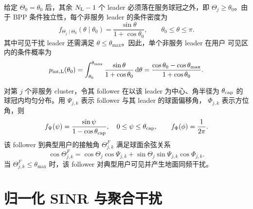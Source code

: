 \documentclass[UTF8,a4paper,11pt]{ctexart}
\newcommand{\thetac}{\theta_{\rm cap}}
\newcommand{\thetam}{\theta_{\max}}
\newcommand{\NL}{N_{\rm L}}
\newcommand{\dd}{\,{\rm d}}
\begin{document}
给定 $\Theta_0=\theta_0$ 后，其余 $\NL-1$ 个 leader 必须落在服务球冠之外，即
$\Theta_j\geq \theta_0$。由于 BPP 条件独立性，每个非服务 leader 的条件密度为
\begin{equation}
    f_{\Theta_j\mid\Theta_0}(\theta\mid\theta_0)
    =
    \frac{\sin\theta}{1+\cos\theta_0},
    \qquad
    \theta_0\leq\theta\leq\pi .
    \label{eq:conditional-leader}
\end{equation}
其中可见干扰 leader 还需满足 $\theta\leq\thetam$。因此，单个非服务 leader 在用户
可见区内的条件概率为
\begin{equation}
    p_{\rm int,L}(\theta_0)
    =
    \int_{\theta_0}^{\thetam}
    \frac{\sin\theta}{1+\cos\theta_0}\dd\theta
    =
    \frac{\cos\theta_0-\cos\thetam}{1+\cos\theta_0}.
    \label{eq:visible-interferer-prob}
\end{equation}

对第 $j$ 个非服务 cluster，令其 follower 在以该 leader 为中心、角半径为
$\thetac$ 的球冠内均匀分布。用 $\Psi_{j,k}$ 表示 follower 与其 leader 的球面偏移角，
$\Phi_{j,k}$ 表示方位角，则
\begin{equation}
    f_{\Psi}(\psi)=
    \frac{\sin\psi}{1-\cos\thetac},
    \quad 0\leq\psi\leq\thetac,
    \qquad
    f_{\Phi}(\phi)=\frac{1}{2\pi}.
\end{equation}
该 follower 到典型用户的接触角 $\Theta^F_{j,k}$ 满足球面余弦关系
\begin{equation}
    \cos\Theta^F_{j,k}
    =
    \cos\Theta_j\cos\Psi_{j,k}
    +\sin\Theta_j\sin\Psi_{j,k}\cos\Phi_{j,k}.
    \label{eq:follower-contact-angle}
\end{equation}
当 $\Theta^F_{j,k}\leq\thetam$ 时，该 follower 对典型用户可见并产生地面同频干扰。

\section{归一化 SINR 与聚合干扰}
\end{document}
